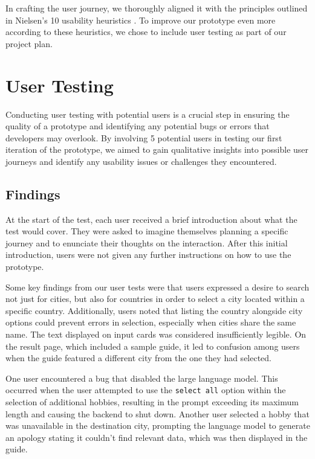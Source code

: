 \documentclass[english,notitlepage,smartquotes]{hgbreport}
\begin{document}
In crafting the user journey, we thoroughly aligned it with the principles outlined in Nielsen's 10 usability heuristics \cite{UsabilityHeuristics}. To improve our prototype even more according to these heuristics, we chose to include user testing as part of our project plan.

\section{User Testing}

Conducting user testing with potential users is a crucial step in ensuring the quality of a prototype and identifying any potential bugs or errors that developers may overlook. By involving 5 potential users in testing our first iteration of the prototype, we aimed to gain qualitative insights into possible user journeys and identify any usability issues or challenges they encountered.

\subsection{Findings}

At the start of the test, each user received a brief introduction about what the test would cover. They were asked to imagine themselves planning a specific journey and to enunciate their thoughts on the interaction. After this initial introduction, users were not given any further instructions on how to use the prototype.

Some key findings from our user tests were that users expressed a desire to search not just for cities, but also for countries in order to select a city located within a specific country. Additionally, users noted that listing the country alongside city options could prevent errors in selection, especially when cities share the same name. The text displayed on input cards was considered insufficiently legible. On the result page, which included a sample guide, it led to confusion among users when the guide featured a different city from the one they had selected.

One user encountered a bug that disabled the large language model. This occurred when the user attempted to use the \texttt{select all} option within the selection of additional hobbies, resulting in the prompt exceeding its maximum length and causing the backend to shut down. Another user selected a hobby that was unavailable in the destination city, prompting the language model to generate an apology stating it couldn't find relevant data, which was then displayed in the guide.
\end{document}
